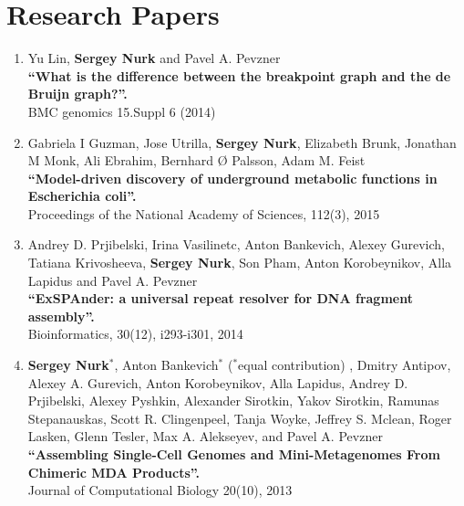 \section{Research Papers}
%
\begin{enumerate}

\item 
Yu Lin, \textbf{Sergey Nurk} and Pavel A. Pevzner\\
\textbf{``What is the difference between the breakpoint graph and the de Bruijn graph?''.} \\
BMC genomics 15.Suppl 6 (2014)

\item Gabriela I Guzman, Jose Utrilla, \textbf{Sergey Nurk}, Elizabeth Brunk, Jonathan M Monk, Ali Ebrahim, Bernhard Ø Palsson, Adam M. Feist\\
\textbf{``Model-driven discovery of underground metabolic functions in Escherichia coli''.} \\
Proceedings of the National Academy of Sciences, 112(3), 2015

\item Andrey D. Prjibelski, Irina Vasilinetc, Anton Bankevich, Alexey Gurevich, Tatiana Krivosheeva, \textbf{Sergey Nurk}, Son Pham, Anton Korobeynikov, Alla Lapidus and Pavel A. Pevzner\\
\textbf{``ExSPAnder: a universal repeat resolver for DNA fragment assembly''.} \\
Bioinformatics, 30(12), i293-i301, 2014

\item \textbf{Sergey Nurk}$^*$, Anton Bankevich$^*$ ($^*$equal contribution)%
, Dmitry Antipov, Alexey A. Gurevich, Anton Korobeynikov, Alla Lapidus, Andrey D. Prjibelski, Alexey Pyshkin, Alexander Sirotkin, Yakov Sirotkin, Ramunas Stepanauskas, Scott R. Clingenpeel, Tanja Woyke, Jeffrey S. Mclean, Roger Lasken, Glenn Tesler, Max A. Alekseyev, and Pavel A. Pevzner \\
\textbf{``Assembling Single-Cell Genomes and Mini-Metagenomes From Chimeric MDA Products''.} \\
Journal of Computational Biology 20(10), 2013


\end{enumerate}
